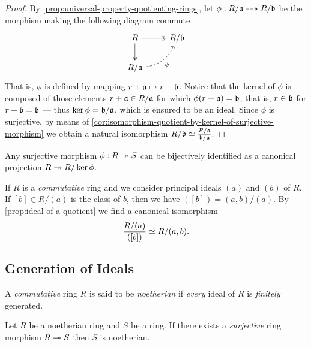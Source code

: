 \begin{proof}
By \cref{prop:universal-property-quotienting-rings}, let
\(\phi: R/\mathfrak{a} \dashrightarrow R/\mathfrak{b}\) be the morphism making the following
diagram commute
\[
\begin{tikzcd}
R \ar[r, two heads] \ar[d, two heads] & R/\ideal{b} \\
R/\ideal{a} \ar[ru, dashed, bend right, "\phi"'] &
\end{tikzcd}
\]
That is, \(\phi\) is defined by mapping \(r + \mathfrak{a} \mapsto r +
\mathfrak{b}\). Notice that the kernel of \(\phi\) is composed of those elements
\(r + \mathfrak{a} \in R/\mathfrak{a}\) for which \(\phi(r + \mathfrak{a}) = \mathfrak{b}\),
that is, \(r \in \mathfrak{b}\) for \(r + \mathfrak{b} = \mathfrak{b}\) --- thus
\(\ker \phi = \mathfrak{b}/\mathfrak{a}\), which is ensured to be an ideal. Since
\(\phi\) is surjective, by means of
\cref{cor:isomorphism-quotient-by-kernel-of-surjective-morphism} we obtain a
natural isomorphism \(R/\mathfrak{b} \simeq \frac{R/\mathfrak{a}}{\mathfrak{b}/\mathfrak{a}}\).
\end{proof}

\begin{corollary}
\label{cor:surjective-is-projection-into-quotient}
Any surjective morphism \(\phi: R \twoheadrightarrow S\) can be bijectively identified as a
canonical projection \(R \twoheadrightarrow R/\ker \phi\).
\end{corollary}

\begin{example}
\label{exp:principal-ideals-and-ideals-of-a-quotient}
If \(R\) is a \emph{commutative} ring and we consider principal ideals \((a)\)
and \((b)\) of \(R\). If \([b] \in R/(a)\) is the class of \(b\), then we have
\(([b]) = (a, b) / (a)\). By \cref{prop:ideal-of-a-quotient} we find a
canonical isomorphism
\[
\frac{R/(a)}{([b])} \simeq R/(a, b).
\]
\end{example}

\subsection{Generation of Ideals}

\begin{definition}
\label{def:noetherian-ring}
A \emph{commutative} ring \(R\) is said to be \emph{noetherian} if \emph{every}
ideal of \(R\) is \emph{finitely} generated.
\end{definition}

\begin{proposition}
\label{prop:image-of-noetherian-is-noetherian}
Let \(R\) be a noetherian ring and \(S\) be a ring. If there exists a
\emph{surjective} ring morphism \(R \twoheadrightarrow S\) then \(S\) is noetherian.
\end{proposition}

